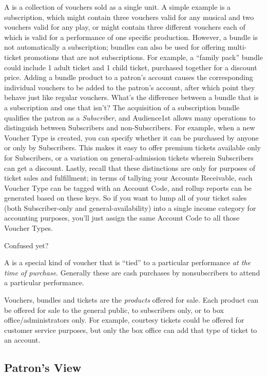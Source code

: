 A  is a collection of vouchers sold as a single unit.
A simple example is a subscription, which might contain three vouchers
valid for any musical and two vouchers valid for any play, or might
contain three different vouchers each of which is valid for a
performance of one specific production.  However, a bundle is not
automatically a subscription; bundles
can also be used for offering multi-ticket promotions that are not
subscriptions.  For example,  a ``family pack''
bundle could include 1 adult ticket and 1 child ticket, purchased
together for a discount price.  Adding a bundle product to a patron's
account causes the corresponding individual vouchers to be
added to the patron's account, after which point they behave just like
regular vouchers.  What's the difference between a bundle that is a
subscription and one that isn't?  The acquisition of a subscription
bundle qualifies the patron as a \emph{Subscriber}, and Audience1st
allows many operations to distinguish between Subscribers and
non-Subscribers.  For example, when a new Voucher Type is created, you
can specify whether it can be purchased by anyone or only by
Subscribers.  This makes it easy to offer premium tickets available only
for Subscribers, or a variation on general-admission tickets wherein
Subscribers can get a discount.  Lastly, recall that these distinctions
are only for purposes of ticket sales and fulfillment; in terms of
tallying your Accounts Receivable, each Voucher Type can be tagged with
an Account Code, and rollup reports can be generated based on these
keys.  So if you want to lump all of your ticket sales (both
Subscriber-only and general-availability) into a single income category
for accounting purposes, you'll just assign the same Account Code to all
those Voucher Types.

Confused yet?

A  is a special kind of voucher that is ``tied'' to a
particular performance \emph{at the time of purchase}.  Generally these
are cash purchases  by nonsubscribers to attend a  particular
performance.  

Vouchers, bundles and tickets are the \emph{products} offered for sale.
Each product can
be offered for sale to the general public, to
subscribers only, or to box office/administrators only.  For example,
courtesy tickets could be offered for customer service purposes, but
only the box office can add that type of ticket to an account.

\subsection{Patron's View}

